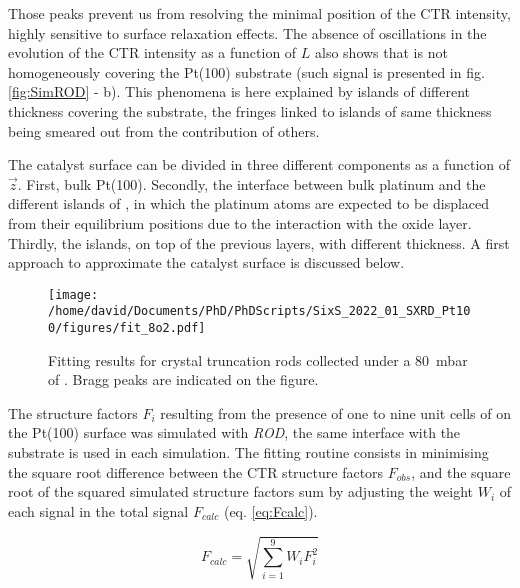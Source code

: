 Those peaks prevent us from resolving the minimal position of the CTR intensity, highly sensitive to surface relaxation effects.
The absence of oscillations in the evolution of the CTR intensity as a function of $L$ also shows that  is not homogeneously covering the Pt(100) substrate (such signal is presented in fig. \ref{fig:SimROD} - b).
This phenomena is here explained by  islands of different thickness covering the substrate, the fringes linked to islands of same thickness being smeared out from the contribution of others.

The catalyst surface can be divided in three different components as a function of $\vec{z}$.
First, bulk Pt(100).
Secondly, the interface between bulk platinum and the different islands of , in which the platinum atoms are expected to be displaced from their equilibrium positions due to the interaction with the oxide layer.
Thirdly, the  islands, on top of the previous layers, with different thickness.
A first approach to approximate the catalyst surface is discussed below.

\begin{figure}[!htb]
    \centering
    \texttt{[image: /home/david/Documents/PhD/PhDScripts/SixS\_2022\_01\_SXRD\_Pt100/figures/fit\_8o2.pdf]}
    \caption{
        Fitting results for crystal truncation rods collected under a \qty{80}{\milli\bar} of .
         Bragg peaks are indicated on the figure.
    }
    \label{fig:CTRFitHighOxygen}
\end{figure}

The structure factors $F_i$ resulting from the presence of one to nine unit cells of  on the Pt(100) surface was simulated with \textit{ROD}, the same interface with the substrate is used in each simulation.
The fitting routine consists in minimising the square root difference between the CTR structure factors $F_{obs}$, and the square root of the squared simulated structure factors sum by adjusting the weight $W_i$ of each signal in the total signal $F_{calc}$ (eq. \ref{eq:Fcalc}).

\begin{equation}
    F_{calc} = \sqrt{\sum_{i=1}^{9} W_i F_i^2}
    \label{eq:Fcalc}
\end{equation}


